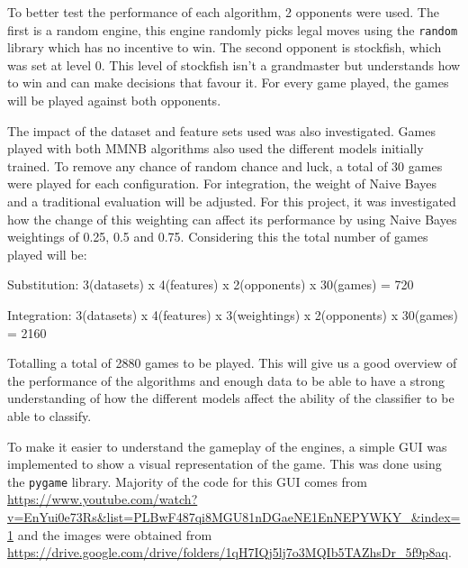 To better test the performance of each algorithm, 2 opponents were used. The first is a random engine, this engine randomly picks legal moves using the \texttt{random} library which has no incentive to win. The second opponent is stockfish, which was set at level 0. This level of stockfish isn't a grandmaster but understands how to win and can make decisions that favour it. For every game played, the games will be played against both opponents.

The impact of the dataset and feature sets used was also investigated. Games played with both MMNB algorithms also used the different models initially trained. To remove any chance of random chance and luck, a total of 30 games were played for each configuration. For integration, the weight of Naive Bayes and a traditional evaluation will be adjusted. For this project, it was investigated how the change of this weighting can affect its performance by using Naive Bayes weightings of 0.25, 0.5 and 0.75. Considering this the total number of games played will be:

Substitution: 3(datasets) x 4(features) x 2(opponents) x 30(games) = 720

Integration: 3(datasets) x 4(features) x 3(weightings) x 2(opponents) x 30(games) = 2160

Totalling a total of 2880 games to be played. This will give us a good overview of the performance of the algorithms and enough data to be able to have a strong understanding of how the different models affect the ability of the classifier to be able to classify. 

To make it easier to understand the gameplay of the engines, a simple GUI was implemented to show a visual representation of the game. This was done using the \texttt{pygame} library. Majority of the code for this GUI comes from \url{https://www.youtube.com/watch?v=EnYui0e73Rs&list=PLBwF487qi8MGU81nDGaeNE1EnNEPYWKY_&index=1} and the images were obtained from \url{https://drive.google.com/drive/folders/1qH7IQj5lj7o3MQIb5TAZhsDr_5f9p8aq}.


